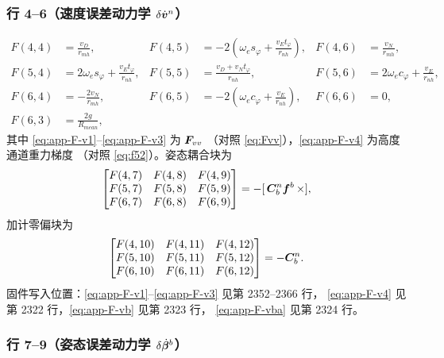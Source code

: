 \subsubsection{行 4--6（速度误差动力学 $\delta\dot{\boldsymbol{v}}^n$）}

\begin{align}
  F(4,4) &= \frac{v_D}{r_{mh}}, &
  F(4,5) &= -2\left(\omega_e s_\varphi + \frac{v_E t_\varphi}{r_{nh}}\right), &
  F(4,6) &= \frac{v_N}{r_{mh}}, \label{eq:app-F-v1} \\
  F(5,4) &= 2\omega_e s_\varphi + \frac{v_E t_\varphi}{r_{nh}}, &
  F(5,5) &= \frac{v_D + v_N t_\varphi}{r_{nh}}, &
  F(5,6) &= 2\omega_e c_\varphi + \frac{v_E}{r_{nh}}, \label{eq:app-F-v2} \\
  F(6,4) &= -\frac{2 v_N}{r_{mh}}, &
  F(6,5) &= -2\left(\omega_e c_\varphi + \frac{v_E}{r_{nh}}\right), &
  F(6,6) &= 0, \label{eq:app-F-v3} \\
  F(6,3) &= \frac{2g}{R_{mean}}, \label{eq:app-F-v4}
\end{align}
其中 \cref{eq:app-F-v1}--\cref{eq:app-F-v3} 为 $\boldsymbol{F}_{vv}$
（对照 \cref{eq:Fvv}），\cref{eq:app-F-v4} 为高度通道重力梯度
（对照 \cref{eq:f52}）。姿态耦合块为
\begin{equation}
  \begin{bmatrix}
    F(4,7) & F(4,8) & F(4,9) \\
    F(5,7) & F(5,8) & F(5,9) \\
    F(6,7) & F(6,8) & F(6,9)
  \end{bmatrix}
  = -[\,\boldsymbol{C}_b^n\boldsymbol{f}^b\,\times],
  \label{eq:app-F-vb}
\end{equation}
加计零偏块为
\begin{equation}
  \begin{bmatrix}
    F(4,10) & F(4,11) & F(4,12) \\
    F(5,10) & F(5,11) & F(5,12) \\
    F(6,10) & F(6,11) & F(6,12)
  \end{bmatrix}
  = -\boldsymbol{C}_b^n.
  \label{eq:app-F-vba}
\end{equation}
固件写入位置：\cref{eq:app-F-v1}--\cref{eq:app-F-v3} 见第 2352--2366 行，
\cref{eq:app-F-v4} 见第 2322 行，\cref{eq:app-F-vb} 见第 2323 行，
\cref{eq:app-F-vba} 见第 2324 行。

\subsubsection{行 7--9（姿态误差动力学 $\delta\dot{\boldsymbol{\beta}}^b$）}

